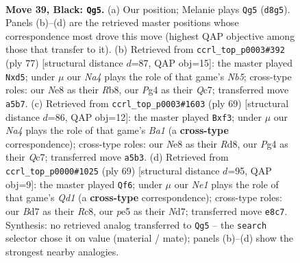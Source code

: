 \documentclass[11pt]{article}
\begin{document}
\clearpage

\begin{figure}[p]\centering
\begin{subfigure}{0.46\textwidth}\centering
\resizebox{\linewidth}{!}{%
\newchessgame
\chessboard[
  setfen={3qn3/3b2k1/p6r/n2BPp1p/PQ1P2p1/N7/5PPP/2R1K1N1 b - - 1 39},
  showmover=false,
  pgfstyle=straightmove, color=movearrow, markmove={d8-g5}
]}
\caption{}
\end{subfigure}\hfill
\begin{subfigure}{0.46\textwidth}\centering
\resizebox{\linewidth}{!}{%
\newchessgame
\chessboard[
  setfen={1r3k2/2qb2p1/5pPp/3B3P/pnpP4/4N3/1P1QPP2/3R2K1 b - - 0 39},
  showmover=false,
  pgfstyle=straightmove, color=movearrow, markmove={b4-d5}
]}
\caption{}
\end{subfigure}
\\[4pt]
\begin{subfigure}{0.46\textwidth}\centering
\resizebox{\linewidth}{!}{%
\newchessgame
\chessboard[
  setfen={b2r2k1/2q2p2/1n2p1p1/RBp4p/8/1P3PP1/PNP4P/2K1Q3 b - - 0 35},
  showmover=false,
  pgfstyle=straightmove, color=movearrow, markmove={a8-f3}
]}
\caption{}
\end{subfigure}\hfill
\begin{subfigure}{0.46\textwidth}\centering
\resizebox{\linewidth}{!}{%
\newchessgame
\chessboard[
  setfen={2rq2k1/3n1pp1/p1b1p2p/P7/1RpPP3/2N2PP1/Q6P/4B1K1 b - - 0 35},
  showmover=false,
  pgfstyle=straightmove, color=movearrow, markmove={d8-f6}
]}
\caption{}
\end{subfigure}
\caption{\textbf{Move 39, Black: \texttt{Qg5}.} (a) Our position; Melanie plays \texttt{Qg5} (\texttt{d8g5}). Panels (b)--(d) are the retrieved master positions whose correspondence most drove this move (highest QAP objective among those that transfer to it). (b) Retrieved from \texttt{ccrl\_top\_p0003\#392} (ply 77) [structural distance $d$=87, QAP obj=15]: the master played \texttt{Nxd5}; under $\mu$ our \emph{Na4} plays the role of that game's \emph{Nb5}; cross-type roles: our \emph{N}e8 as their \emph{R}b8, our \emph{P}g4 as their \emph{Q}c7; transferred move \texttt{a5b7}. (c) Retrieved from \texttt{ccrl\_top\_p0003\#1603} (ply 69) [structural distance $d$=86, QAP obj=12]: the master played \texttt{Bxf3}; under $\mu$ our \emph{Na4} plays the role of that game's \emph{Ba1} (a \textbf{cross-type} correspondence); cross-type roles: our \emph{N}e8 as their \emph{R}d8, our \emph{P}g4 as their \emph{Q}c7; transferred move \texttt{a5b3}. (d) Retrieved from \texttt{ccrl\_top\_p0000\#1025} (ply 69) [structural distance $d$=95, QAP obj=9]: the master played \texttt{Qf6}; under $\mu$ our \emph{Ne1} plays the role of that game's \emph{Qd1} (a \textbf{cross-type} correspondence); cross-type roles: our \emph{B}d7 as their \emph{R}c8, our \emph{p}e5 as their \emph{N}d7; transferred move \texttt{e8c7}. Synthesis: no retrieved analog transferred to \texttt{Qg5} -- the \texttt{search} selector chose it on value (material / mate); panels (b)--(d) show the strongest nearby analogies.}
\label{fig:thought-m77}
\end{figure}
\end{document}
